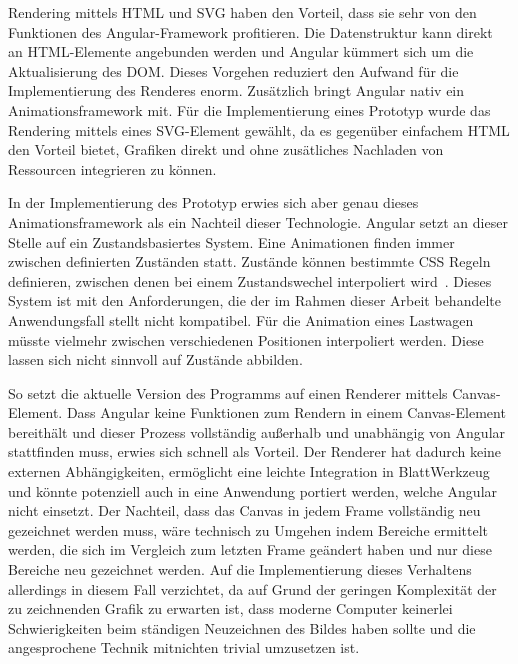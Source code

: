 Rendering mittels HTML und SVG haben den Vorteil, dass sie sehr von den Funktionen des Angular-Framework profitieren. Die Datenstruktur kann direkt an HTML-Elemente angebunden werden und Angular kümmert sich um die Aktualisierung des DOM. Dieses Vorgehen reduziert den Aufwand für die Implementierung des Renderes enorm. Zusätzlich bringt Angular nativ ein Animationsframework mit. Für die Implementierung eines Prototyp wurde das Rendering mittels eines SVG-Element gewählt, da es gegenüber einfachem HTML den Vorteil bietet, Grafiken direkt und ohne zusätliches Nachladen von Ressourcen integrieren zu können.

In der Implementierung des Prototyp erwies sich aber genau dieses Animationsframework als ein Nachteil dieser Technologie. Angular setzt an dieser Stelle auf ein Zustandsbasiertes System. Eine Animationen finden immer zwischen definierten Zuständen statt. Zustände können bestimmte CSS Regeln definieren, zwischen denen bei einem Zustandswechel interpoliert wird~\cite{angular-animations}. Dieses System ist mit den Anforderungen, die der im Rahmen dieser Arbeit behandelte Anwendungsfall stellt nicht kompatibel. Für die Animation eines Lastwagen müsste vielmehr zwischen verschiedenen Positionen interpoliert werden. Diese lassen sich nicht sinnvoll auf Zustände abbilden.

So setzt die aktuelle Version des Programms auf einen Renderer mittels Canvas-Element. Dass Angular keine Funktionen zum Rendern in einem Canvas-Element bereithält und dieser Prozess vollständig außerhalb und unabhängig von Angular stattfinden muss, erwies sich schnell als Vorteil. Der Renderer hat dadurch keine externen Abhängigkeiten, ermöglicht eine leichte Integration in BlattWerkzeug und könnte potenziell auch in eine Anwendung portiert werden, welche Angular nicht einsetzt. Der Nachteil, dass das Canvas in jedem Frame vollständig neu gezeichnet werden muss, wäre technisch zu Umgehen indem Bereiche ermittelt werden, die sich im Vergleich zum letzten Frame geändert haben und nur diese Bereiche neu gezeichnet werden. Auf die Implementierung dieses Verhaltens allerdings in diesem Fall verzichtet, da auf Grund der geringen Komplexität der zu zeichnenden Grafik zu erwarten ist, dass moderne Computer keinerlei Schwierigkeiten beim ständigen Neuzeichnen des Bildes haben sollte und die angesprochene Technik mitnichten trivial umzusetzen ist.

